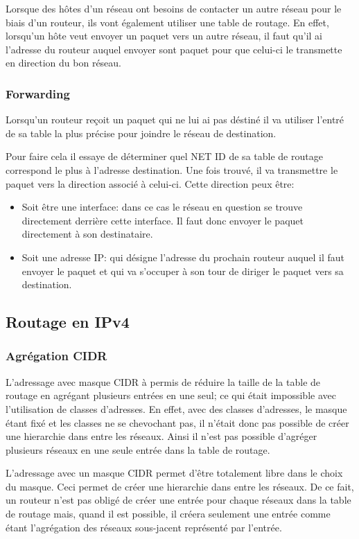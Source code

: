 Lorsque des hôtes d'un réseau ont besoins de contacter un autre réseau pour le
biais d'un routeur, ils vont également utiliser une table de routage.  En
effet, lorsqu'un hôte veut envoyer un paquet vers un autre réseau, il faut
qu'il ai l'adresse du routeur auquel envoyer sont paquet pour que celui-ci le
transmette en direction du bon réseau.

\subsubsection{Forwarding}

Lorsqu'un routeur reçoit un paquet qui ne lui ai pas déstiné il va utiliser
l'entré de sa table la plus précise pour joindre le réseau de destination.

Pour faire cela il essaye de déterminer quel NET ID de sa table de routage
correspond le plus à l'adresse destination.  Une fois trouvé, il va transmettre
le paquet vers la direction associé à celui-ci.
Cette direction peux être:
\begin{itemize}
\item Soit être une interface: dans ce cas le réseau en question se trouve
directement derrière cette interface. Il faut donc envoyer le paquet
directement à son destinataire.
\item Soit une adresse IP: qui désigne l'adresse du prochain routeur auquel il
faut envoyer le paquet et qui va s'occuper à son tour de diriger le paquet vers
sa destination.
\end{itemize}

\subsection{Routage en IPv4}
\subsubsection{Agrégation CIDR}
L'adressage avec masque CIDR à permis de réduire la taille de la table de
routage en agrégant plusieurs entrées en une seul; ce qui était impossible avec
l'utilisation de classes d'adresses.  En effet, avec des classes d'adresses, le
masque étant fixé et les classes ne se chevochant pas, il n'était donc pas
possible de créer une hierarchie dans entre les réseaux.  Ainsi il n'est pas
possible d'agréger plusieurs réseaux en une seule entrée dans la table de
routage.

L'adressage avec un masque CIDR permet d'être totalement libre dans le choix du
masque. Ceci permet de créer une hierarchie dans entre les réseaux. De ce fait,
un routeur n'est pas obligé de créer une entrée pour chaque réseaux dans la
table de routage mais, quand il est possible, il créera seulement une entrée
comme étant l'agrégation des réseaux sous-jacent représenté par l'entrée.

